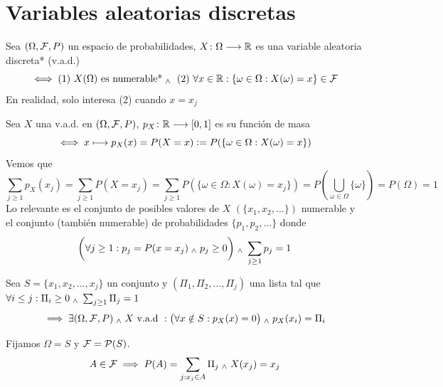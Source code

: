 \vspace{-1.5cm}
\section{Variables aleatorias discretas}
\begin{defn}
	Sea $(\Omega, \mathcal{F}, P)$ un espacio de probabilidades, $X \colon \Omega \longrightarrow \mathbb{R}$ es una variable aleatoria discreta* (v.a.d.)
	\[\iff \text{(1) } X(\Omega) \text{ es numerable*} \; _{\wedge} \; \text{ (2) }\forall x \in \mathbb{R} : \{\omega \in \Omega : X(\omega)=x\} \in \mathcal{F}\]
	En realidad, solo interesa (2) cuando $x=x_j$
\end{defn}
\begin{defn}
	Sea $X$ una v.a.d. en $(\Omega, \mathcal{F}, P)$, $p_X \colon \mathbb{R} \longrightarrow \left[0,1\right]$ es su función de masa
	\[\iff x\longmapsto p_X(x)=P(X=x)\vcentcolon= P(\{\omega \in \Omega : X(\omega)=x\})\]
	Vemos que
	\[\sum_{j\geq1}p_X(x_j)=\sum_{j\geq1}P(X=x_j)=\sum_{j\geq1} P(\{\omega \in \Omega : X(\omega)=x_j\})=P\left(\bigcup_{\omega\in\Omega}\{\omega\}\right)=P(\Omega)=1\]
	Lo relevante es el conjunto de posibles valores de $X$ $(\{x_1, x_2, \dots\})$
	numerable y el conjunto (también numerable) de probabilidades $\{p_1, p_2,
		\dots\}$ donde
	\[\bigg(\forall j \geq 1 : p_j=P(x=x_j) \; _{\wedge} \; p_j\geq 0 \bigg) \; _{\wedge} \; \sum_{j\geq 1}p_j=1\]
\end{defn}
\begin{teo}
	Sea $S=\{x_1, x_2, \dots, x_j\}$ un conjunto y $(\Pi_1, \Pi_2, \dots, \Pi_j)$ una lista tal que \\
	$\forall i \leq j : \Pi_i \geq 0 \; _{\wedge} \; \sum_{j\geq 1}\Pi_j=1$
	\[\implies \exists (\Omega, \mathcal{F}, P) \; _{\wedge} \; X\text{ v.a.d }:\big(\forall  x\notin S :p_X(x)= 0 \big) \; _{\wedge} \; p_X(x_i)=\Pi_i\]
	\begin{dem}
		Fijamos $\Omega = S$ y $\mathcal{F}=\mathcal{P}(S)$.
		\[A\in \mathcal{F} \implies P(A)=\sum_{j:x_j\in A}\Pi_j \; _{\wedge} \; X(x_j)=x_j\]
	\end{dem}
\end{teo}

